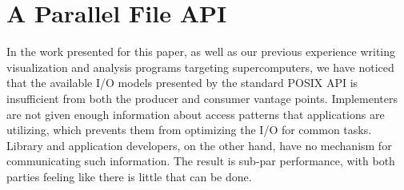 



\section{A Parallel File API}\label{sec:design}

In the work presented for this paper, as well as our previous
experience writing visualization and analysis programs targeting
supercomputers, we have noticed that the available I/O models presented
by the standard POSIX API is insufficient from both the producer and
consumer vantage points.  Implementers are not given enough information
about access patterns that applications are utilizing, which prevents
them from optimizing the I/O for common tasks.  Library and application
developers, on the other hand, have no mechanism for communicating such
information.  The result is sub-par performance, with both parties
feeling like there is little that can be done.

